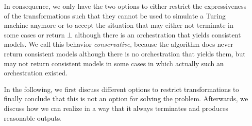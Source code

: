 In consequence, we only have the two options to either restrict the expressiveness of the transformations such that they cannot be used to simulate a Turing machine anymore or to accept the situation that  may either not terminate in some cases or return $\bot$ although there is an orchestration that yields consistent models.
We call this behavior \emph{conservative}, because the algorithm does never return consistent models although there is no orchestration that yields them, but may not return consistent models in some cases in which actually such an orchestration existed.

In the following, we first discuss different options to restrict transformations to finally conclude that this is not an option for solving the problem.
Afterwards, we discuss how we can realize  in a way that it always terminates and produces reasonable outputs.







